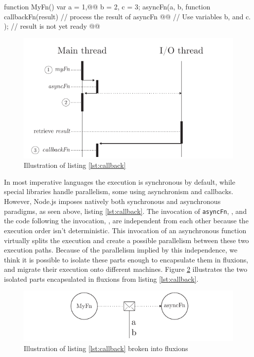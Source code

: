 \begin{code}[Javascript, caption={Example of an asynchronous function call},label={lst:callback}]
function MyFn() { 
  var a = 1,@@
      b = 2,
      c = 3;
  asyncFn(a, b, function callbackFn(result) {
    // process the result of asyncFn @@
    // Use variables b, and c.
  });
  // result is not yet ready @@
}
\end{code}

\begin{figure}[h!]
  \includegraphics[width=\linewidth]{callback.pdf}
  \caption{Illustration of listing \ref{lst:callback}}
  \label{fig:callback}
\end{figure}

In most imperative languages the execution is synchronous by default, while special libraries handle parallelism, some using asynchronism and callbacks\cite{Liskov1988}.
However, Node.js imposes natively both synchronous and asynchronous paradigms, as seen above, listing \ref{lst:callback}.
The invocation of \texttt{asyncFn}, , and the code following the invocation, , are independent from each other because the execution order isn't deterministic.
This invocation of an asynchronous function virtually splits the execution and create a possible parallelism between these two execution paths.
Because of the parallelism implied by this independence, we think it is possible to isolate these parts enough to encapsulate them in fluxions, and migrate their execution onto different machines.
Figure \ref{fig:callback} illustrates the two isolated parts encapsulated in fluxions from listing \ref{lst:callback}.

\begin{figure}[h!]
  \includegraphics[width=\linewidth]{callbackFlx.pdf}
  \caption{Illustration of listing \ref{lst:callback} broken into fluxions}
  \label{fig:callback}
\end{figure}

